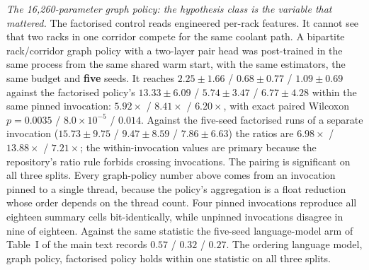 \emph{The 16{,}260-parameter graph policy: the hypothesis class is the variable
that mattered.}  The factorised control reads engineered per-rack features.  It cannot
see that two racks in one corridor compete for the same coolant path. A bipartite rack/corridor graph policy with a two-layer pair head was post-trained
in the same process from the same shared warm start, with the same estimators, the
same budget and \textbf{five} seeds.  It reaches $2.25\pm1.66$ / $0.68\pm0.77$ / $1.09\pm0.69$ against the factorised
policy's $13.33\pm6.09$ / $5.74\pm3.47$ / $6.77\pm4.28$ within the same pinned
invocation: $5.92\times$ / $8.41\times$ / $6.20\times$, with exact paired Wilcoxon
$p=0.0035$ / $8.0\times10^{-5}$ / $0.014$.  Against the five-seed factorised runs of a
separate invocation ($15.73\pm9.75$ / $9.47\pm8.59$ / $7.86\pm6.63$) the ratios are
$6.98\times$ / $13.88\times$ / $7.21\times$; the within-invocation values are primary
because the repository's ratio rule forbids crossing invocations.  The
pairing is significant on all three splits.  Every graph-policy number above comes
from an invocation pinned to a single thread, because the policy's aggregation is a
float reduction whose order depends on the thread count. Four pinned invocations
reproduce all eighteen summary cells bit-identically, while unpinned invocations
disagree in nine of eighteen.  Against the
same statistic the five-seed language-model arm of Table~I of the main text records $0.57$ /
$0.32$ / $0.27$. The ordering language model, graph policy, factorised policy
holds within one statistic on all three splits.
